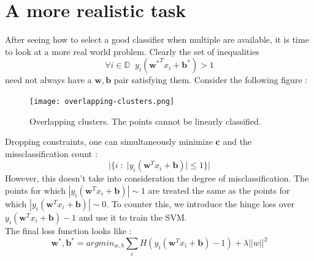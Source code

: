 \documentclass[12pt]{article}
\begin{document}
\section{A more realistic task}
After seeing how to select a good classifier when multiple are available, it is time to look at a more real world problem. Clearly the set of inequalities 
$$\forall i \in \mathbb{D}\;\; y_i({\mathbf{w}^*}^Tx_i+\mathbf{b}^*) > 1$$
need not always have a $\mathbf{w,b}$ pair satisfying them. Consider the following figure :
\begin{figure}[H]
    \centering
    \texttt{[image: overlapping-clusters.png]}
    \caption{Overlapping clusters. The points cannot be linearly classified.}
\end{figure}
Dropping constraints, one can simultaneously minimize $\mathbf{c}$ and the missclassification count :
$$|\{i\; : \;|y_i(\mathbf{w}^Tx_i+\mathbf{b})|\leq 1\}|$$
However, this doesn't take into consideration the degree of misclassification. The points for which $|y_i(\mathbf{w}^Tx_i+\mathbf{b})|\sim 1$ are treated the same as the points for which $|y_i(\mathbf{w}^Tx_i+\mathbf{b})|\sim 0$. To counter this, we introduce the hinge loss over $y_i(\mathbf{w}^Tx_i+\mathbf{b})-1$ and use it to train the SVM.\\
The final loss function looks like :
$$ \mathbf{w}^*, \mathbf{b}^* = argmin_{w,b} \sum_i H(y_i(\mathbf{w}^Tx_i+\mathbf{b})-1) + \lambda||w||^2 $$
\end{document}
